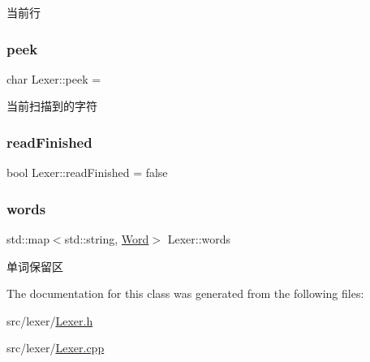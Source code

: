 当前行 

\mbox{\label{class_lexer_a1c13ae056a34e7ec483c561152bb8d49}} 
\subsubsection{\texorpdfstring{peek}{peek}}
{\footnotesize\ttfamily char Lexer\+::peek = \textquotesingle{} \textquotesingle{}\hspace{0.3cm}{\ttfamily [private]}}



当前扫描到的字符 

\mbox{\label{class_lexer_a123d0134daef2ce492f0707342456afc}} 
\subsubsection{\texorpdfstring{read\+Finished}{readFinished}}
{\footnotesize\ttfamily bool Lexer\+::read\+Finished = false\hspace{0.3cm}{\ttfamily [private]}}

\mbox{\label{class_lexer_add52df03b8546bfe059f4e1832141c16}} 
\subsubsection{\texorpdfstring{words}{words}}
{\footnotesize\ttfamily std\+::map$<$std\+::string, \hyperlink{class_word}{Word}$>$ Lexer\+::words\hspace{0.3cm}{\ttfamily [private]}}



单词保留区 



The documentation for this class was generated from the following files\+:\begin{DoxyCompactItemize}
\item 
src/lexer/\hyperlink{_lexer_8h}{Lexer.\+h}\item 
src/lexer/\hyperlink{_lexer_8cpp}{Lexer.\+cpp}\end{DoxyCompactItemize}
